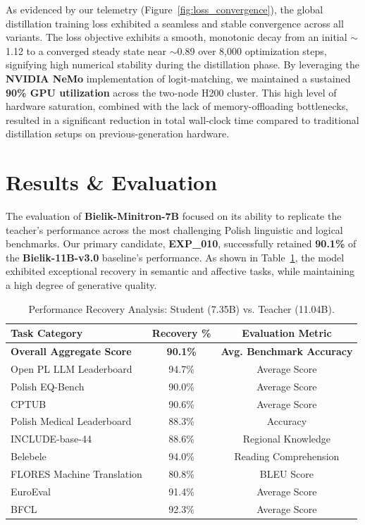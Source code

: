 \documentclass{article}
\begin{document}
As evidenced by our telemetry (Figure~\ref{fig:loss_convergence}), the global distillation training loss exhibited a seamless and stable convergence across all variants. The loss objective exhibits a smooth, monotonic decay from an initial $\sim$1.12 to a converged steady state near $\sim$0.89 over 8,000 optimization steps, signifying high numerical stability during the distillation phase. By leveraging the \textbf{NVIDIA NeMo} implementation of logit-matching, we maintained a sustained \textbf{90\% GPU utilization} across the two-node H200 cluster. This high level of hardware saturation, combined with the lack of memory-offloading bottlenecks, resulted in a significant reduction in total wall-clock time compared to traditional distillation setups on previous-generation hardware.

\section{Results \& Evaluation}
The evaluation of \textbf{Bielik-Minitron-7B} focused on its ability to replicate the teacher's performance across the most challenging Polish linguistic and logical benchmarks. Our primary candidate, \textbf{EXP\_010}, successfully retained \textbf{90.1\%} of the \textbf{Bielik-11B-v3.0} baseline's performance. As shown in Table~\ref{tab:results-recovery-detailed}, the model exhibited exceptional recovery in semantic and affective tasks, while maintaining a high degree of generative quality.

\begin{table}[h]
    \centering
    \begin{tabular}{lcc}
        \toprule
        \textbf{Task Category} & \textbf{Recovery \%} & \textbf{Evaluation Metric} \\
        \midrule
        \textbf{Overall Aggregate Score} & \textbf{90.1\%} & \textbf{Avg. Benchmark Accuracy} \\
        Open PL LLM Leaderboard & 94.7\%  & Average Score \\
        Polish EQ-Bench & 90.0\%  & Average Score \\
        CPTUB & 90.6\%  & Average Score \\
        Polish Medical Leaderboard & 88.3\%  & Accuracy \\
        INCLUDE-base-44 & 88.6\%  & Regional Knowledge \\
        Belebele & 94.0\%  & Reading Comprehension \\
        FLORES Machine Translation & 80.8\%  & BLEU Score \\
        EuroEval & 91.4\%  & Average Score \\
        BFCL & 92.3\% & Average Score \\
        \bottomrule
    \end{tabular}
    \caption{Performance Recovery Analysis: Student (7.35B) vs. Teacher (11.04B).}
    \label{tab:results-recovery-detailed}
\end{table}
\end{document}

